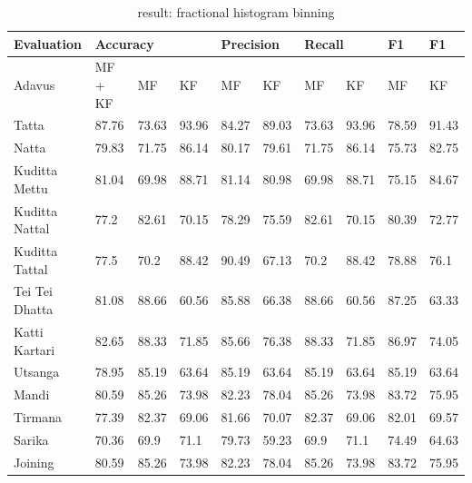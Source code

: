 \begin{table}[]
\hspace*{-1.25cm}
\begin{tabular}{|l|l|l|l|l|l|l|l|l|l|}
\hline
Evaluation & \multicolumn{3}{l|}{Accuracy} & \multicolumn{2}{l|}{Precision} & \multicolumn{2}{l|}{Recall} & F1 & F1 \\ \hline
Adavus         & MF + KF & MF    & KF    & MF    & KF    & MF    & KF    & MF    & KF    \\ \hline
Tatta          & 87.76   & 73.63 & 93.96 & 84.27 & 89.03 & 73.63 & 93.96 & 78.59 & 91.43 \\ \hline
Natta          & 79.83   & 71.75 & 86.14 & 80.17 & 79.61 & 71.75 & 86.14 & 75.73 & 82.75 \\ \hline
Kuditta Mettu  & 81.04   & 69.98 & 88.71 & 81.14 & 80.98 & 69.98 & 88.71 & 75.15 & 84.67 \\ \hline
Kuditta Nattal & 77.2    & 82.61 & 70.15 & 78.29 & 75.59 & 82.61 & 70.15 & 80.39 & 72.77 \\ \hline
Kuditta Tattal & 77.5    & 70.2  & 88.42 & 90.49 & 67.13 & 70.2  & 88.42 & 78.88 & 76.1  \\ \hline
Tei Tei Dhatta & 81.08   & 88.66 & 60.56 & 85.88 & 66.38 & 88.66 & 60.56 & 87.25 & 63.33 \\ \hline
Katti Kartari  & 82.65   & 88.33 & 71.85 & 85.66 & 76.38 & 88.33 & 71.85 & 86.97 & 74.05 \\ \hline
Utsanga        & 78.95   & 85.19 & 63.64 & 85.19 & 63.64 & 85.19 & 63.64 & 85.19 & 63.64 \\ \hline
Mandi          & 80.59   & 85.26 & 73.98 & 82.23 & 78.04 & 85.26 & 73.98 & 83.72 & 75.95 \\ \hline
Tirmana        & 77.39   & 82.37 & 69.06 & 81.66 & 70.07 & 82.37 & 69.06 & 82.01 & 69.57 \\ \hline
Sarika         & 70.36   & 69.9  & 71.1  & 79.73 & 59.23 & 69.9  & 71.1  & 74.49 & 64.63 \\ \hline
Joining        & 80.59   & 85.26 & 73.98 & 82.23 & 78.04 & 85.26 & 73.98 & 83.72 & 75.95 \\ \hline
\end{tabular}
\caption{result: fractional histogram binning}
\label{tab:Ch06T003}
\end{table}



















